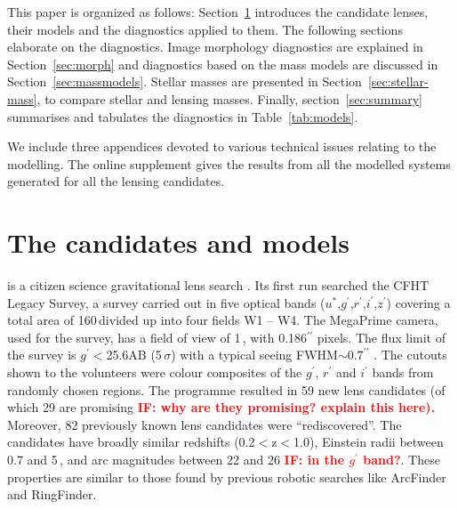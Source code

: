 This paper is organized as follows:
Section~\ref{sec:candidates_models} introduces the candidate lenses,
their models and the diagnostics applied to them.  The following
sections elaborate on the diagnostics.  Image morphology diagnostics
are explained in Section~\ref{sec:morph} and diagnostics based on the
mass models are discussed in Section~\ref{sec:massmodels}.  Stellar masses are
presented in Section~\ref{sec:stellar-mass}, to compare stellar and
lensing masses.  Finally, section~\ref{sec:summary}
summarises and tabulates the diagnostics in Table~\ref{tab:models}.

We include three appendices devoted to various technical issues
relating to the modelling.  The online supplement gives the results
from all the modelled systems generated for all the lensing
candidates.

\section{The candidates and models}
\label{sec:candidates_models}

\SW is a citizen science gravitational lens search
\citep{2016MNRAS.455.1171M}.  Its first run searched the CFHT Legacy
Survey, a survey carried out in five optical bands
($u^*$,$g^\prime$,$r^\prime$,$i^\prime$,$z^\prime$) covering a total
area of 160\,\sqdeg divided up into four fields W1 -- W4.  The
MegaPrime camera, used for the survey, has a field of view of
1\,\sqdeg, with 0.186$^{\prime\prime}$ pixels. The flux limit of the
survey is $g^\prime<$25.6AB (5\,$\sigma$) with a typical seeing
FWHM$\sim 0.7^{\prime\prime}$ \citep{2013MNRAS.433.2545E}. The cutouts
shown to the volunteers were colour composites of the $g^\prime$,
$r^\prime$ and $i^\prime$ bands from randomly chosen regions.
The programme \citep{2016MNRAS.455.1191M} resulted in 59 new lens candidates (of which 29 are
promising  \textcolor{red}{\bf IF: why are
  they promising? explain this here).}  Moreover, 82 previously known
lens candidates were ``rediscovered''.  The candidates have broadly
similar redshifts (0.2$<$z$<$1.0), Einstein radii between 0.7 and
5\,\arcsec, and arc magnitudes between 22 and 26 \textcolor{red}{\bf
  IF: in the $g^\prime$ band?}. These properties are similar to those
found by previous robotic searches like ArcFinder and RingFinder.


